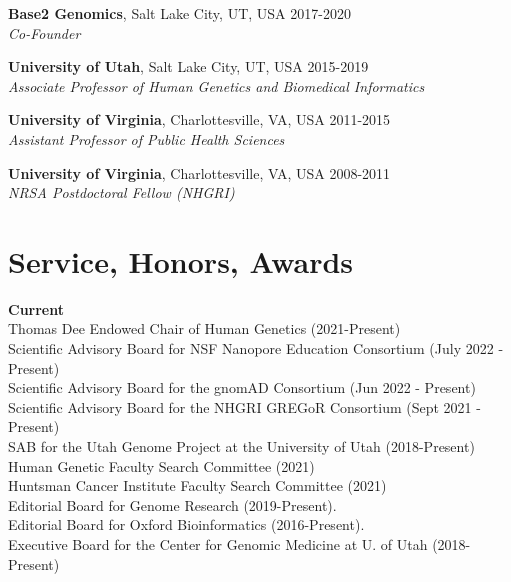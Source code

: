 \documentclass[margin,line]{cv}
\begin{document}
\begin{resume}
    \textbf{Base2 Genomics}, Salt Lake City, UT, USA                                        \hfill 2017-2020\\
    \textit{Co-Founder}                                                                                     

    \textbf{University of Utah}, Salt Lake City, UT, USA                                   \hfill 2015-2019\\
    \textit{Associate Professor of Human Genetics and Biomedical Informatics}                              

    \textbf{University of Virginia}, Charlottesville, VA, USA                              \hfill 2011-2015\\
    \textit{Assistant Professor of Public Health Sciences}                              

    \textbf{University of Virginia}, Charlottesville, VA, USA                              \hfill 2008-2011\\
    \textit{NRSA Postdoctoral Fellow (NHGRI)}                                          

    \section{\mysidestyle Service, Honors, Awards}
    \textbf{Current}\\
    Thomas Dee Endowed Chair of Human Genetics (2021-Present)  \\\vspace{1mm}%
    Scientific Advisory Board for NSF Nanopore Education Consortium (July 2022 - Present) \\\vspace{1mm}%
    Scientific Advisory Board for the gnomAD Consortium (Jun 2022 - Present) \\\vspace{1mm}%
    Scientific Advisory Board for the NHGRI GREGoR Consortium (Sept 2021 - Present) \\\vspace{1mm}%
    SAB for the Utah Genome Project at the University of Utah (2018-Present) \\\vspace{1mm}%
    Human Genetic Faculty Search Committee (2021) \\\vspace{1mm}%
    Huntsman Cancer Institute Faculty Search Committee (2021) \\\vspace{1mm}%
    Editorial Board for Genome Research (2019-Present). \\\vspace{1mm}%
    Editorial Board for Oxford Bioinformatics (2016-Present). \\\vspace{1mm}%
    Executive Board for the Center for Genomic Medicine at U. of Utah (2018-Present) \\\vspace{1mm}%


\end{resume}
\end{document}
